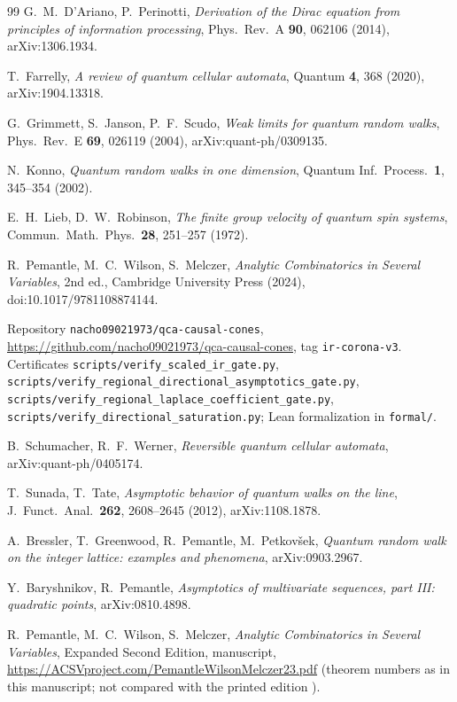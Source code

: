 \documentclass[11pt]{amsart}
\theoremstyle{definition}
\theoremstyle{remark}
\begin{document}
\begin{thebibliography}{99}
G.~M.~D'Ariano, P.~Perinotti,
\emph{Derivation of the Dirac equation from principles of information processing},
Phys.\ Rev.\ A \textbf{90}, 062106 (2014), arXiv:1306.1934.

T.~Farrelly,
\emph{A review of quantum cellular automata},
Quantum \textbf{4}, 368 (2020), arXiv:1904.13318.

G.~Grimmett, S.~Janson, P.~F.~Scudo,
\emph{Weak limits for quantum random walks},
Phys.\ Rev.\ E \textbf{69}, 026119 (2004), arXiv:quant-ph/0309135.

N.~Konno,
\emph{Quantum random walks in one dimension},
Quantum Inf.\ Process.\ \textbf{1}, 345--354 (2002).

E.~H.~Lieb, D.~W.~Robinson,
\emph{The finite group velocity of quantum spin systems},
Commun.\ Math.\ Phys.\ \textbf{28}, 251--257 (1972).

R.~Pemantle, M.~C.~Wilson, S.~Melczer,
\emph{Analytic Combinatorics in Several Variables}, 2nd ed.,
Cambridge University Press (2024), doi:10.1017/9781108874144.

Repository \texttt{nacho09021973/qca-causal-cones},
\url{https://github.com/nacho09021973/qca-causal-cones}, tag
\texttt{ir-corona-v3}.
Certificates
\texttt{scripts/verify\_scaled\_ir\_gate.py},
\texttt{scripts/verify\_regional\_directional\_asymptotics\_gate.py},
\texttt{scripts/verify\_regional\_laplace\_coefficient\_gate.py},
\texttt{scripts/verify\_directional\_saturation.py}; Lean formalization in
\texttt{formal/}.

B.~Schumacher, R.~F.~Werner,
\emph{Reversible quantum cellular automata},
arXiv:quant-ph/0405174.

T.~Sunada, T.~Tate,
\emph{Asymptotic behavior of quantum walks on the line},
J.\ Funct.\ Anal.\ \textbf{262}, 2608--2645 (2012), arXiv:1108.1878.

A.~Bressler, T.~Greenwood, R.~Pemantle, M.~Petkov\v{s}ek,
\emph{Quantum random walk on the integer lattice: examples and phenomena},
arXiv:0903.2967.

Y.~Baryshnikov, R.~Pemantle,
\emph{Asymptotics of multivariate sequences, part III: quadratic points},
arXiv:0810.4898.

R.~Pemantle, M.~C.~Wilson, S.~Melczer,
\emph{Analytic Combinatorics in Several Variables}, Expanded Second Edition,
manuscript, \url{https://ACSVproject.com/PemantleWilsonMelczer23.pdf}
(theorem numbers as in this manuscript; not compared with the printed
edition \cite{ACSV}).

\end{thebibliography}
\end{document}
